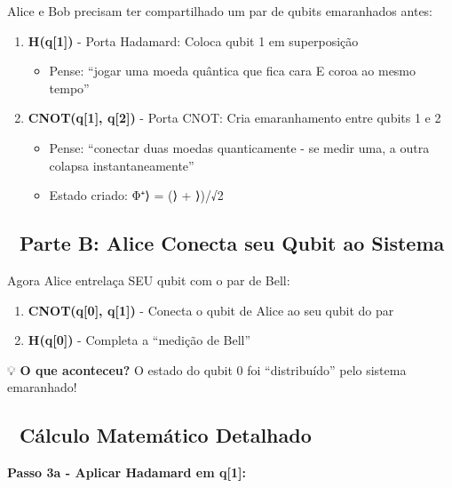 \documentclass[
  brazilian,
]{report}
\providecommand{\tightlist}{%
  \setlength{\itemsep}{0pt}\setlength{\parskip}{0pt}}
\begin{document}
Alice e Bob precisam ter compartilhado um par de qubits emaranhados
antes:

\begin{enumerate}
\def\labelenumi{\arabic{enumi}.}
\tightlist
\item
  \textbf{H(q{[}1{]})} - Porta Hadamard: Coloca qubit 1 em superposição

  \begin{itemize}
  \tightlist
  \item
    Pense: ``jogar uma moeda quântica que fica cara E coroa ao mesmo
    tempo''
  \end{itemize}
\item
  \textbf{CNOT(q{[}1{]}, q{[}2{]})} - Porta CNOT: Cria emaranhamento
  entre qubits 1 e 2

  \begin{itemize}
  \tightlist
  \item
    Pense: ``conectar duas moedas quanticamente - se medir uma, a outra
    colapsa instantaneamente''
  \item
    Estado criado: \textbar Φ⁺⟩ = (⟩ + ⟩)/√2
  \end{itemize}
\end{enumerate}

\subsection{📡 Parte B: Alice Conecta seu Qubit ao
Sistema}\label{parte-b-alice-conecta-seu-qubit-ao-sistema}

Agora Alice entrelaça SEU qubit com o par de Bell:

\begin{enumerate}
\def\labelenumi{\arabic{enumi}.}
\setcounter{enumi}{2}
\tightlist
\item
  \textbf{CNOT(q{[}0{]}, q{[}1{]})} - Conecta o qubit de Alice ao seu
  qubit do par
\item
  \textbf{H(q{[}0{]})} - Completa a ``medição de Bell''
\end{enumerate}

💡 \textbf{O que aconteceu?} O estado do qubit 0 foi ``distribuído''
pelo sistema emaranhado!

\subsection{📐 Cálculo Matemático
Detalhado}\label{cuxe1lculo-matemuxe1tico-detalhado}

\textbf{Passo 3a - Aplicar Hadamard em q{[}1{]}:}
\end{document}
